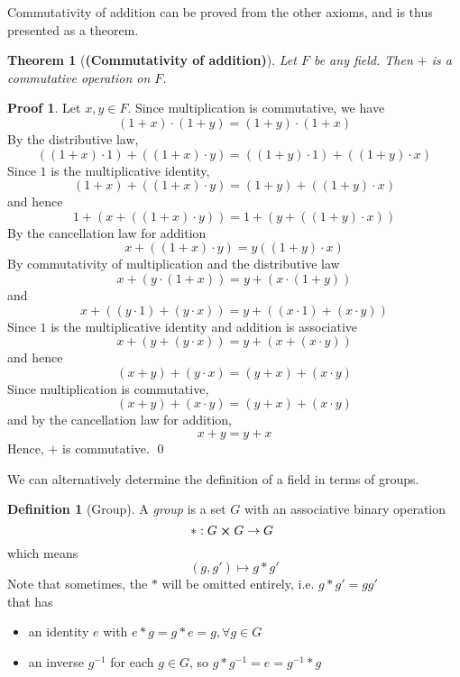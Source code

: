 \documentclass[12pt, a4paper, openany]{report}
\newtheorem{thm}{Theorem}
\theoremstyle{definition}
\newtheorem{defn}{Definition}
\newtheorem*{prf}{Proof}
\theoremstyle{remark}
\begin{document}
Commutativity of addition can be proved from the other axioms, and is thus presented as a theorem.

\begin{thm}[\textbf{(Commutativity of addition)}]
    Let $F$ be any field. Then $+$ is a commutative operation on $F$.
\end{thm}

\begin{prf}
    Let $x,y \in F$. Since multiplication is commutative, we have
    $$(1 + x) \cdot (1 + y) = (1+y) \cdot (1+x)$$
    By the distributive law,
    $$((1 + x) \cdot 1) + ((1 + x) \cdot y) = ((1+y) \cdot 1) + ((1 + y) \cdot x)$$
    Since $1$ is the multiplicative identity,
    $$(1+x) + ((1+x)  \cdot y) = (1+y) + ((1 + y) \cdot x)$$
    and hence
    $$1 + (x + ((1 + x)  \cdot y)) = 1 + (y + ((1 + y) \cdot x))$$
    By the cancellation law for addition
    $$x + ((1 + x) \cdot y) = y ((1 + y) \cdot x)$$
    By commutativity of multiplication and the distributive law
    $$x + (y \cdot (1+x)) = y + (x \cdot (1 + y))$$
    and
    $$x + ((y \cdot 1) + (y \cdot x)) = y + ((x \cdot 1) + (x \cdot y))$$
    Since $1$ is the multiplicative identity and addition is associative
    $$x + (y + (y \cdot x)) = y + (x + (x \cdot y))$$
    and hence
    \[(x + y) + (y \cdot x) = (y + x) + (x \cdot y)  \]
    Since multiplication is commutative,
    \[ (x + y) + (x \cdot y) = (y + x) + (x \cdot y) \]
    and by the cancellation law for addition,
    \[ x + y = y + x \]
    Hence, \(+\) is commutative. \qed
\end{prf}

We can alternatively determine the definition of a field in terms of groups.

\begin{defn} [Group]
    A \textit{group} is a set \( G \) with an associative binary operation
    \[ \ast:  G \cross G \rightarrow G\ \]
    which means
    \[ (g, g') \mapsto g \ast g' \]
    Note that sometimes, the \( \ast \) will be omitted entirely, i.e. \( g \ast g' = g g' \) \\
    that has
    \begin{itemize}
        \item an identity \( e \) with \( e \ast g = g \ast e = g,  \forall  g \in G \)
        \item an inverse \( g^{-1} \) for each \( g \in G \), so \( g \ast g^{-1} = e = g^{-1} \ast g \)
    \end{itemize}
\end{defn}
\end{document}
